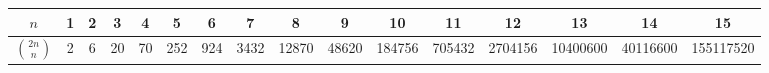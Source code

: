 \begin{center}
\begin{tabular}{c|c@{\ }c@{\ }c@{\ }c@{\ }c@{\ }c@{\ }c@{\ }c@{\ }c@{\ }c@{\ }c@{\ }c@{\ }c@{\ }c@{\ }c}
$n$             & 1 & 2 & 3  & 4  & 5   & 6   & 7    & 8     & 9     & 10     & 11     & 12      & 13       & 14       & 15\\
\hline
$\binom{2n}{n}$ & 2 & 6 & 20 & 70 & 252 & 924 & 3432 & 12870 & 48620 & 184756 & 705432 & 2704156 & 10400600 & 40116600 & 155117520\\
\end{tabular}\\
\end{center}
